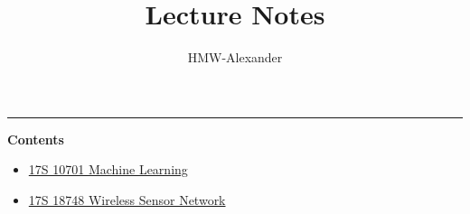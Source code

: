 \documentclass[letterpaper,11pt]{article}
\title{\textbf{Lecture Notes}}
\author{HMW-Alexander}
\newcommand{\panhline}{\begin{center}\rule{\textwidth}{1pt}\end{center}}
\begin{document}
\maketitle

\panhline
\textbf{Contents}

\begin{itemize}
	\item \href{./17S_10701_MachineLearning/index.html}{17S 10701 Machine Learning}
	\item \href{./17S_18748_WirelessSensorNetwork/index.html}{17S 18748 Wireless Sensor Network}
\end{itemize}
\end{document}
